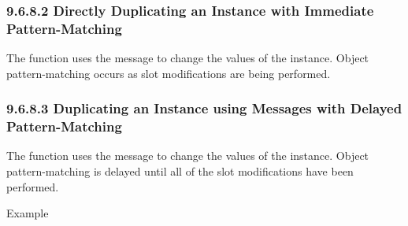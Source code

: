 \documentclass[letterpaper,10pt,english]{sphinxmanual}
\begin{document}
\subsubsection{9.6.8.2 Directly Duplicating an Instance with Immediate Pattern-Matching}
\label{\detokenize{cool:directly-duplicating-an-instance-with-immediate-pattern-matching}}
The  function uses the 
message to change the values of the instance. Object pattern-matching
occurs as slot modifications are being performed.


\begin{sphinxVerbatim}[commandchars=\\\{\}]
  \PYG{p}{[} \PYG{p}{]} 
\end{sphinxVerbatim}


\subsubsection{9.6.8.3 Duplicating an Instance using Messages with Delayed Pattern-Matching}
\label{\detokenize{cool:duplicating-an-instance-using-messages-with-delayed-pattern-matching}}
The  function uses the
 message to change the values of the instance.
Object pattern-matching is delayed until all of the slot modifications
have been performed.


\begin{sphinxVerbatim}[commandchars=\\\{\}]
  \PYG{p}{[} \PYG{p}{]} 
\end{sphinxVerbatim}

Example
\end{document}
